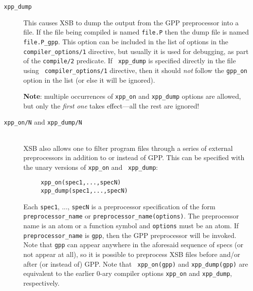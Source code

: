 \begin{description}
\item[{\tt xpp\_dump}] 
  This causes XSB to dump the output from the GPP preprocessor into a file.
  If the file being compiled is named {\tt file.P} then the dump file is
  named {\tt file.P\_gpp}. This option can be included in the list of
  options in the {\tt compiler\_options/1} directive, but usually it is
  used for debugging, as part of the {\tt compile/2} predicate. If {\tt
    xpp\_dump} is specified directly in the file using {\tt
    compiler\_options/1} directive, then it should \emph{not} follow the
  {\tt gpp\_on} option in the list (or else it will be ignored).

  {\bf Note}: multiple occurrences of {\tt xpp\_on} and {\tt xpp\_dump}
  options are allowed, but only the \emph{first one} takes effect---all the
  rest are ignored!  


\item[{\tt xpp\_on/N} and {\tt xpp\_dump/N}]
  ~\\
  XSB also allows one to filter program files through a series of external
  preprocessors in addition to or instead of GPP.
  This can be specified with the unary versions of {\tt xpp\_on} and {\tt
    xpp\_dump}:
\begin{verbatim}
     xpp_on(spec1,...,specN)  
     xpp_dump(spec1,...,specN)  
\end{verbatim}
  Each {\tt spec1}, ..., {\tt specN} is a preprocessor specification of
  the form {\tt preprocessor\_name} or {\tt preprocessor\_name(options)}.
  The preprocessor name is an atom or a function symbol and {\tt options}
  must be an atom. If {\tt preprocessor\_name} is {\tt gpp}, then the GPP
  preprocessor will be invoked. Note that {\tt gpp} can appear anywhere in
  the aforesaid sequence of specs (or not appear at all), so it is possible to preprocess
  XSB files before and/or after (or instead of) GPP. Note that {\tt
    xpp\_on(gpp)}  and {\tt xpp\_dump(gpp)} are equivalent to the earlier
  0-ary compiler options {\tt xpp\_on}
  and {\tt xpp\_dump}, respectively. 


\end{description}
